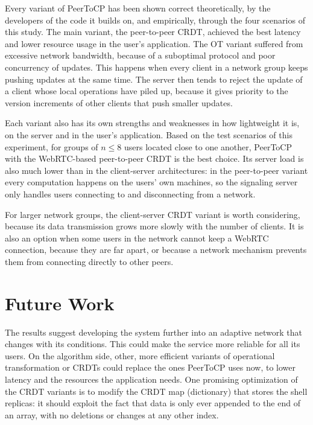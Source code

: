 Every variant of PeerToCP has been shown correct theoretically, by the developers of the code it builds on, and empirically, through the four scenarios of this study. The main variant, the peer-to-peer CRDT, achieved the best latency and lower resource usage in the user's application. The OT variant suffered from excessive network bandwidth, because of a suboptimal protocol and poor concurrency of updates. This happens when every client in a network group keeps pushing updates at the same time. The server then tends to reject the update of a client whose local operations have piled up, because it gives priority to the version increments of other clients that push smaller updates.

Each variant also has its own strengths and weaknesses in how lightweight it is, on the server and in the user's application. Based on the test scenarios of this experiment, for groups of $n \leq 8$ users located close to one another, PeerToCP with the WebRTC-based peer-to-peer CRDT is the best choice. Its server load is also much lower than in the client-server architectures: in the peer-to-peer variant every computation happens on the users' own machines, so the signaling server only handles users connecting to and disconnecting from a network.

For larger network groups, the client-server CRDT variant is worth considering, because its data transmission grows more slowly with the number of clients. It is also an option when some users in the network cannot keep a WebRTC connection, because they are far apart, or because a network mechanism prevents them from connecting directly to other peers.

\section{Future Work}
\label{sec:saran}

The results suggest developing the system further into an adaptive network that changes with its conditions. This could make the service more reliable for all its users. On the algorithm side, other, more efficient variants of operational transformation or CRDTs could replace the ones PeerToCP uses now, to lower latency and the resources the application needs. One promising optimization of the CRDT variants is to modify the CRDT map (dictionary) that stores the shell replicas: it should exploit the fact that data is only ever appended to the end of an array, with no deletions or changes at any other index.

